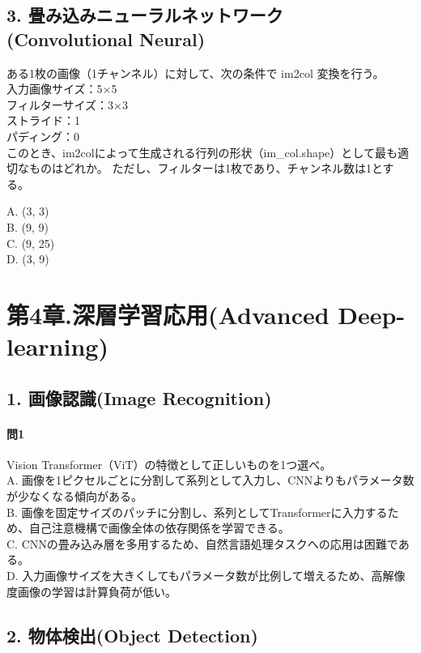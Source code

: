 \documentclass[
  letterpaper,
  DIV=11,
  numbers=noendperiod]{scrreprt}
\begin{document}
\chapter{3. 畳み込みニューラルネットワーク (Convolutional
Neural)}\label{ux7573ux307fux8fbcux307fux30cbux30e5ux30fcux30e9ux30ebux30cdux30c3ux30c8ux30efux30fcux30af-convolutional-neural}

ある1枚の画像（1チャンネル）に対して、次の条件で im2col 変換を行う。\\
入力画像サイズ：5×5\\
フィルターサイズ：3×3\\
ストライド：1\\
パディング：0\\
このとき、im2colによって生成される行列の形状（im\_col.shape）として最も適切なものはどれか。
ただし、フィルターは1枚であり、チャンネル数は1とする。

A. (3, 3)\\
B. (9, 9)\\
C. (9, 25)\\
D. (3, 9)

\part{第4章.深層学習応用(Advanced Deep-learning)}

\chapter{1. 画像認識(Image
Recognition)}\label{ux753bux50cfux8a8dux8b58image-recognition}

\subsection{問1}\label{ux554f1-2}

Vision Transformer（ViT）の特徴として正しいものを1つ選べ。\\
A.
画像を1ピクセルごとに分割して系列として入力し、CNNよりもパラメータ数が少なくなる傾向がある。\\
B.
画像を固定サイズのパッチに分割し、系列としてTransformerに入力するため、自己注意機構で画像全体の依存関係を学習できる。\\
C.
CNNの畳み込み層を多用するため、自然言語処理タスクへの応用は困難である。\\
D.
入力画像サイズを大きくしてもパラメータ数が比例して増えるため、高解像度画像の学習は計算負荷が低い。

\chapter{2. 物体検出(Object
Detection)}\label{ux7269ux4f53ux691cux51faobject-detection}
\end{document}
